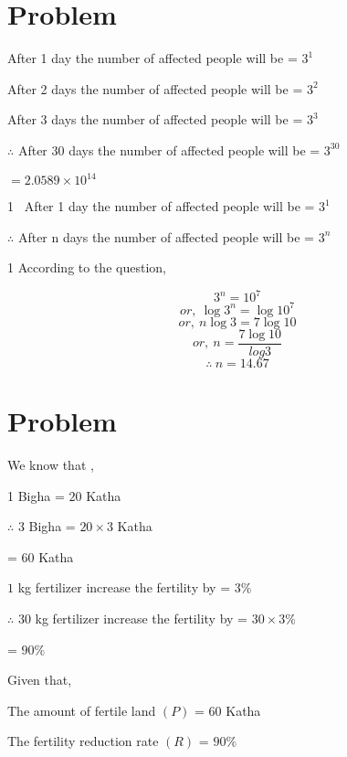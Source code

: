 \documentclass{report}
\begin{document}
\section{Problem}

\: \quad After 1 day the number of affected people will be = $3^{1}$

After 2 days the number of affected people will be = $3^{2}$

After 3 days the number of affected people will be = $3^{3}$

$\therefore$ After 30 days the number of affected people will be = $3^{30}$

\quad\quad\quad\quad\quad\quad\quad\quad\quad\quad\quad\quad\quad\quad\quad\quad\quad\quad\quad\quad\quad\quad\qquad $= 2.0589 \times 10^14$


\hspace{35cm}
1\quad\ \hspace{3cm} \quad After 1 day the number of affected people will be = $3^{1}$

$\therefore$ After n days the number of affected people will be = $3^{n}$

\hspace{35cm}
1 According to the question,

$$3^{n} = 10^{7}$$
$$or,\:\log 3^{n} = \log 10^{7}$$
$$or, \: n\log 3 = 7\log 10 $$
$$or, \: n = \frac{7\log 10}{log 3} $$
$$\therefore \: n = 14.67 $$

\section{Problem}

We know that ,

1 Bigha = $20 $ Katha

$\therefore$ 3 Bigha = $20\times 3$ Katha

\:\:\:\:\quad\quad\quad\quad = $60$ Katha

\hspace{35cm}

$1$ kg fertilizer  increase the fertility by = $3\%$

$\therefore$ $30$ kg fertilizer increase the fertility by = $30\times3\%$

\hspace{6cm} = $90\%$

Given that,

The amount of fertile land $(P)$ = $60$ Katha

The fertility reduction rate $(R)$ = $90\%$
\end{document}

